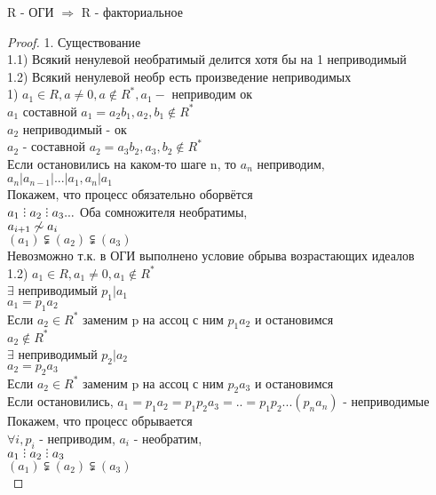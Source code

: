 \begin{theorem}
	R - ОГИ $ \Rightarrow $ R - факториальное \\
	\begin{proof}
		1. Существование \\
		1.1) Всякий ненулевой необратимый делится хотя бы на 1 неприводимый \\
		1.2) Всякий ненулевой необр есть произведение неприводимых \\
		1) $ a_1 \in R, a \neq 0, a \notin R^*, a_1 -$ неприводим ок\\
		$ a_1 $ составной $ a_1 = a_2b_1, a_2, b_1 \notin R^* $ \\
		$ a_2 $ неприводимый - ок \\
		$ a_2 $ - составной $ a_2 = a_3b_2, a_3,b_2 \notin R^* $ \\
		Если остановились на каком-то шаге n, то $a_n$ неприводим,  \\
		$ a_n | a_{n-1} | ... | a_1, a_n | a_1 $ \\
		Покажем, что процесс обязательно оборвётся \\
		$ a_1 \divby a_2 \divby a_3 ... $ Оба сомножителя необратимы, \\
		$ a_{i+1} \centernot\sim a_i $ \\
		$ (a_1) \subsetneqq (a_2) \subsetneqq (a_3)  $ \\
		Невозможно т.к. в ОГИ выполнено условие обрыва возрастающих идеалов \\
		1.2) $ a_1 \in R, a_1 \neq 0, a_1 \notin R^* $ \\
		$ \exists $ неприводимый $ p_1 | a_1 $ \\
		$ a_1 = p_1 a_2 $ \\
		Если $ a_2 \in R^* $ заменим p на ассоц с ним $ p_1a_2 $ и остановимся \\
		$ a_2 \notin R^*$ \\
		$ \exists $ неприводимый $ p_2 | a_2 $ \\
		$ a_2 = p_2 a_3 $ \\
		Если $ a_2 \in R^* $ заменим p на ассоц с ним $ p_2a_3$ и остановимся \\
		Если остановились, $ a_1 = p_1a_2 = p_1p_2a_3 = .. = p_1p_2...(p_na_n) $ -  неприводимые
		Покажем, что процесс обрывается \\
		$ \forall i, p_i $ - неприводим, $ a_i $ - необратим, \\ 
		$ a_1 \divby a_2 \divby a_3 $ \\
		$ (a_1) \subsetneqq (a_2) \subsetneqq (a_3)  $ \\

\end{proof}
\end{theorem}
